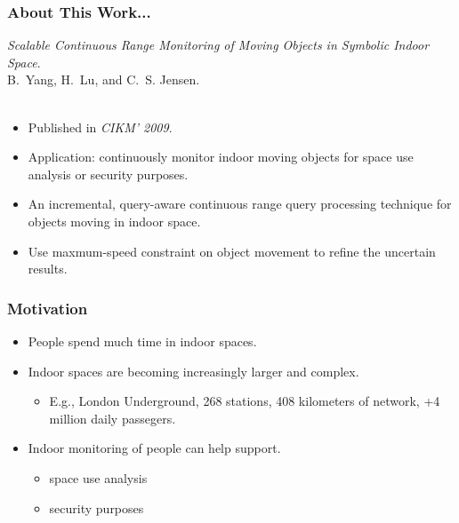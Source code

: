 \begin{frame}
\frametitle{About This Work...}

\emph{Scalable Continuous Range Monitoring of Moving Objects in Symbolic Indoor Space}.~\cite{DBLP:conf/cikm/YangLJ09} \\
B.~Yang, H.~Lu, and C.~S. Jensen.\\~\\

\begin{itemize}
  \item Published in \emph{CIKM' 2009}.
  \item Application: continuously monitor indoor moving objects for space use analysis or security purposes.
  \item An incremental, query-aware continuous range query processing technique for objects moving in indoor space.
  \item Use maxmum-speed constraint on object movement to refine the uncertain results.
\end{itemize}

\end{frame}

\begin{frame}
\frametitle{Motivation}

\begin{itemize}
  \item People spend much time in indoor spaces.

  \item Indoor spaces are becoming increasingly larger and complex.
    \begin{itemize}
      \item E.g., London Underground, 268 stations, 408 kilometers of network, +4 million daily passegers.
    \end{itemize}

  \item Indoor monitoring of people can help support.
    \begin{itemize}
      \item space use analysis
      \item security purposes
    \end{itemize}
\end{itemize}

\end{frame}


